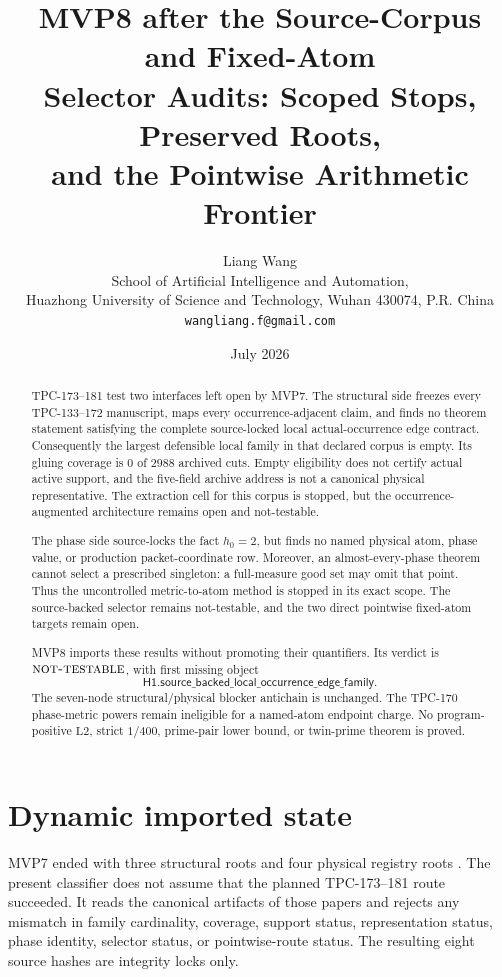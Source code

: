 \documentclass[11pt]{article}
\title{\textbf{MVP8 after the Source-Corpus and Fixed-Atom}\\
\textbf{Selector Audits: Scoped Stops, Preserved Roots,}\\
\textbf{and the Pointwise Arithmetic Frontier}}
\author{Liang Wang\\
School of Artificial Intelligence and Automation,\\
Huazhong University of Science and Technology, Wuhan 430074, P.R. China\\
\texttt{wangliang.f@gmail.com}}
\date{July 2026}
\theoremstyle{definition}
\theoremstyle{remark}
\newcommand{\NT}{\textnormal{\textsc{not-testable}}}
\newcommand{\Ltwo}{\mathrm{L2}}
\begin{document}
\maketitle

\begin{abstract}
TPC-173--181 test two interfaces left open by MVP7.  The structural
side freezes every TPC-133--172 manuscript, maps every
occurrence-adjacent claim, and finds no theorem statement satisfying
the complete source-locked local actual-occurrence edge contract.
Consequently the largest defensible local family in that declared
corpus is empty.  Its gluing coverage is \(0\) of \(2988\) archived
cuts.  Empty eligibility does not certify actual active support, and
the five-field archive address is not a canonical physical
representative.  The extraction cell for this corpus is stopped, but
the occurrence-augmented architecture remains open and
not-testable.

The phase side source-locks the fact \(h_0=2\), but finds no named
physical atom, phase value, or production packet-coordinate row.
Moreover, an almost-every-phase theorem cannot select a prescribed
singleton: a full-measure good set may omit that point.  Thus the
uncontrolled metric-to-atom method is stopped in its exact scope.
The source-backed selector remains not-testable, and the two direct
pointwise fixed-atom targets remain open.

MVP8 imports these results without promoting their quantifiers.  Its
verdict is \(\NT\), with first missing object
\[
\mathsf{H1.source\_backed\_local\_occurrence\_edge\_family}.
\]
The seven-node structural/physical blocker antichain is unchanged.
The TPC-170 phase-metric powers remain ineligible for a named-atom
endpoint charge.  No program-positive \(\Ltwo\), strict \(1/400\),
prime-pair lower bound, or twin-prime theorem is proved.
\end{abstract}

\section{Dynamic imported state}

MVP7 ended with three structural roots and four physical registry
roots \citep{WangTPC172}.  The present classifier does not assume that
the planned TPC-173--181 route succeeded.  It reads the canonical
artifacts of those papers and rejects any mismatch in family
cardinality, coverage, support status, representation status, phase
identity, selector status, or pointwise-route status.  The resulting
eight source hashes are integrity locks only.
\end{document}
